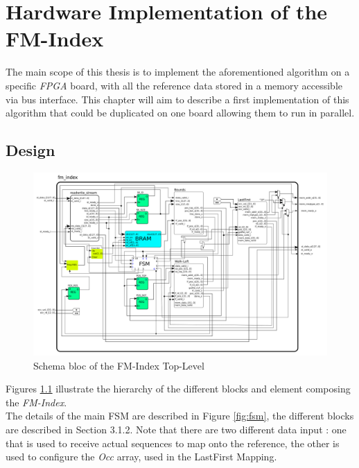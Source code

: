 
\chapter{Hardware Implementation of the FM-Index} %

\label{Chapter3} %
The main scope of this thesis is to implement the aforementioned algorithm on a specific \textsl{FPGA} board, with all the reference data stored in a memory accessible via bus interface. This chapter will aim to describe a first implementation of this algorithm that could be duplicated on one board allowing them to run in parallel.

\section{Design}

\begin{figure}[H]
    \centering
    \hspace*{-25mm}\includegraphics[scale = 0.45]{Figures/fmindex_top.png}
    \caption{Schema bloc of the FM-Index Top-Level}
    \label{fig:seqschema}
\end{figure}

Figures \ref{fig:seqschema} illustrate the hierarchy of the different blocks and element composing the \textsl{FM-Index}. \\

The details of the main FSM are described in Figure \ref{fig:fsm}, the different blocks are described in Section 3.1.2. Note that there are two different data input : one that is used to receive actual sequences to map onto the reference, the other is used to configure the \textsl{Occ} array, used in the LastFirst Mapping.

